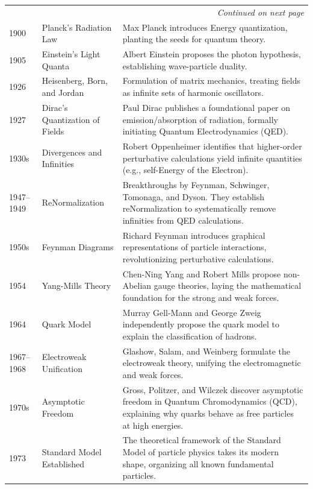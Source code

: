 \documentclass[a4paper, 10pt, onepage]{elegantbook}
\begin{document}
{\begin{longtable}{p{} p{} p{}}
\midrule
\multicolumn{3}{r}{\textit{Continued on next page}} \\
\endfoot

\bottomrule
\endlastfoot

1900 & Planck's Radiation Law & Max Planck introduces Energy quantization, planting the seeds for quantum theory. \\
\midrule
1905 & Einstein's Light Quanta & Albert Einstein proposes the photon hypothesis, establishing wave-particle duality. \\
\midrule
1926 & Heisenberg, Born, and Jordan & Formulation of matrix mechanics, treating fields as infinite sets of harmonic 
oscillators. \\
\midrule
1927 & Dirac's Quantization of Fields & Paul Dirac publishes a foundational paper on emission/absorption of radiation, 
formally initiating Quantum Electrodynamics (QED). \\
\midrule
1930s & Divergences and Infinities & Robert Oppenheimer identifies that higher-order perturbative calculations yield 
infinite quantities (e.g., self-Energy of the Electron). \\
\midrule
1947--1949 & ReNormalization & Breakthroughs by Feynman, Schwinger, Tomonaga, and Dyson. They establish reNormalization 
to systematically remove infinities from QED calculations. \\
\midrule
1950s & Feynman Diagrams & Richard Feynman introduces graphical representations of particle interactions, 
revolutionizing perturbative calculations. \\
\midrule
1954 & Yang-Mills Theory & Chen-Ning Yang and Robert Mills propose non-Abelian gauge theories, laying the mathematical 
foundation for the strong and weak forces. \\
\midrule
1964 & Quark Model & Murray Gell-Mann and George Zweig independently propose the quark model to explain the 
classification of hadrons. \\
\midrule
1967--1968 & Electroweak Unification & Glashow, Salam, and Weinberg formulate the electroweak theory, unifying the 
electromagnetic and weak forces. \\
\midrule
1970s & Asymptotic Freedom & Gross, Politzer, and Wilczek discover asymptotic freedom in Quantum Chromodynamics (QCD), 
explaining why quarks behave as free particles at high energies. \\
\midrule
1973 & Standard Model Established & The theoretical framework of the Standard Model of particle physics takes its 
modern shape, organizing all known fundamental particles. \\

\end{longtable}}
\end{document}
